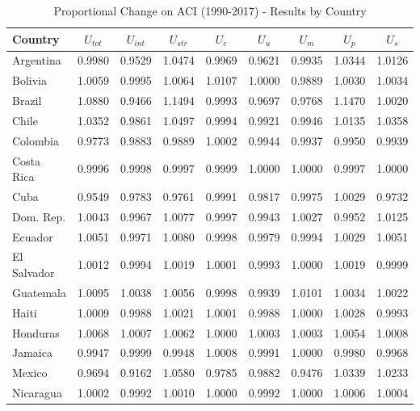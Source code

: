 \documentclass[energies,article,accept,moreauthors,12pt,a4paper]{mdpi} %
\begin{document}
  \begin{table}[!h]\label{11}										
\begin{center}\caption{Proportional Change on ACI (1990-2017) - Results by Country}			
\begin{tabular}{l|c|c:c|ccc:cc}\hline	
Country	&$	U_{tot}	$&$	U_{int}	$&$	U_{str}	$&$	U_e	$&$	U_u	$&$	U_m	$&$	U_p	$&$	U_s$	\\\hline
 Argentina 	 & 	0.9980 	 & 	0.9529 	&	1.0474 	&	0.9969 	&	0.9621 	&	0.9935 	&	1.0344 	&	1.0126 	\\
 Bolivia 	 & 	1.0059 	 & 	0.9995 	&	1.0064 	&	1.0107 	&	1.0000 	&	0.9889 	&	1.0030 	&	1.0034 	\\
 Brazil 	 & 	1.0880 	 & 	0.9466 	&	1.1494 	&	0.9993 	&	0.9697 	&	0.9768 	&	1.1470 	&	1.0020 	\\
 Chile 	 & 	1.0352 	 & 	0.9861 	&	1.0497 	&	0.9994 	&	0.9921 	&	0.9946 	&	1.0135 	&	1.0358 	\\
 Colombia 	 & 	0.9773 	 & 	0.9883 	&	0.9889 	&	1.0002 	&	0.9944 	&	0.9937 	&	0.9950 	&	0.9939 	\\
 Costa Rica 	 & 	0.9996 	 & 	0.9998 	&	0.9997 	&	0.9999 	&	1.0000 	&	1.0000 	&	0.9997 	&	1.0000 	\\
 Cuba 	 & 	0.9549 	 & 	0.9783 	&	0.9761 	&	0.9991 	&	0.9817 	&	0.9975 	&	1.0029 	&	0.9732 	\\
 Dom. Rep. 	 & 	1.0043 	 & 	0.9967 	&	1.0077 	&	0.9997 	&	0.9943 	&	1.0027 	&	0.9952 	&	1.0125 	\\
 Ecuador 	 & 	1.0051 	 & 	0.9971 	&	1.0080 	&	0.9998 	&	0.9979 	&	0.9994 	&	1.0029 	&	1.0051 	\\
 El Salvador 	 & 	1.0012 	 & 	0.9994 	&	1.0019 	&	1.0001 	&	0.9993 	&	1.0000 	&	1.0019 	&	0.9999 	\\
 Guatemala 	 & 	1.0095 	 & 	1.0038 	&	1.0056 	&	0.9998 	&	0.9939 	&	1.0101 	&	1.0034 	&	1.0022 	\\
 Haiti 	 & 	1.0009 	 & 	0.9988 	&	1.0021 	&	1.0001 	&	0.9988 	&	1.0000 	&	1.0028 	&	0.9993 	\\
 Honduras 	 & 	1.0068 	 & 	1.0007 	&	1.0062 	&	1.0000 	&	1.0003 	&	1.0003 	&	1.0054 	&	1.0008 	\\
 Jamaica 	 & 	0.9947 	 & 	0.9999 	&	0.9948 	&	1.0008 	&	0.9991 	&	1.0000 	&	0.9980 	&	0.9968 	\\
 Mexico 	 & 	0.9694 	 & 	0.9162 	&	1.0580 	&	0.9785 	&	0.9882 	&	0.9476 	&	1.0339 	&	1.0233 	\\
 Nicaragua 	 & 	1.0002 	 & 	0.9992 	&	1.0010 	&	1.0000 	&	0.9992 	&	1.0000 	&	1.0006 	&	1.0004 	\\

\end{tabular}
\end{center}
\end{table}
\end{document}
